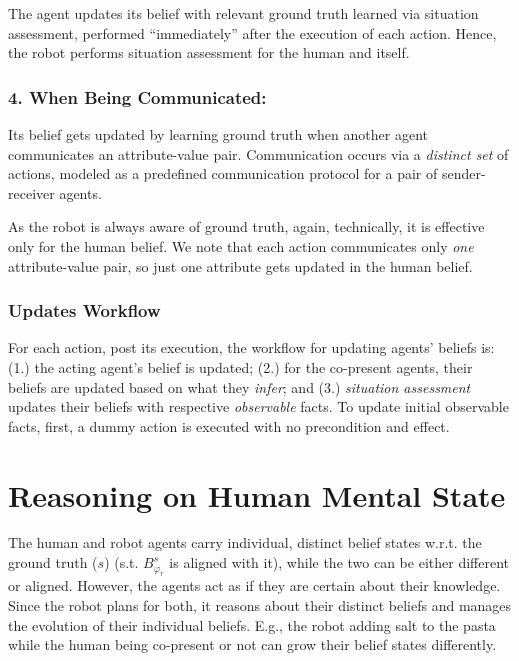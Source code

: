 \documentclass[letterpaper]{article} %
\begin{document}
The agent updates its belief with relevant ground truth learned via situation assessment, performed ``immediately'' after the execution of each action. 
Hence, the robot performs situation assessment for the human and itself.

\subsubsection{4. When Being Communicated:}
Its belief gets updated by learning ground truth when another agent communicates an attribute-value pair. Communication occurs via a \textit{distinct set} of actions, modeled as a predefined communication protocol for a pair of sender-receiver agents. 

As the robot is always aware of ground truth, again, technically, it is effective only for the human belief.
We note that each action communicates only {\em one} attribute-value pair, so just one attribute gets updated in the human belief.


\subsubsection{Updates Workflow}
For each action, post its execution, the workflow for updating agents' beliefs is: (1.) the acting agent's belief is updated; (2.)
for the co-present agents, their beliefs are updated based on what they \textit{infer};
and (3.) \textit{situation assessment} updates their beliefs with respective \textit{observable} facts. 
To update initial observable facts, first, a dummy action is executed with no precondition and effect.

\section{Reasoning on Human Mental State}
The human and robot agents carry individual, distinct belief states w.r.t. the ground truth ($s$) (s.t. $\mathit{B}_{\varphi_r}^s$ is aligned with it), while the two can be either different or aligned. 
However, the agents act as if they are certain about their knowledge.  
Since the robot plans for both, it reasons about their distinct beliefs and manages the evolution of their individual beliefs. E.g., the robot adding salt to the pasta while the human being co-present or not can grow their belief states differently. 
\end{document}
